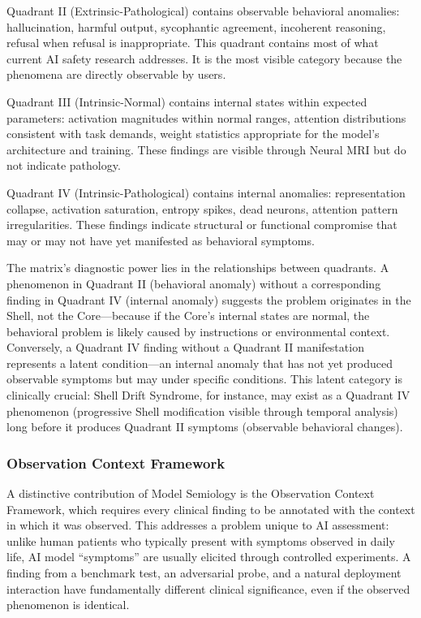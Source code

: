 \documentclass[11pt]{article}
\begin{document}
Quadrant II (Extrinsic-Pathological) contains observable behavioral anomalies: hallucination, harmful output, sycophantic agreement, incoherent reasoning, refusal when refusal is inappropriate. This quadrant contains most of what current AI safety research addresses. It is the most visible category because the phenomena are directly observable by users.

Quadrant III (Intrinsic-Normal) contains internal states within expected parameters: activation magnitudes within normal ranges, attention distributions consistent with task demands, weight statistics appropriate for the model's architecture and training. These findings are visible through Neural MRI but do not indicate pathology.

Quadrant IV (Intrinsic-Pathological) contains internal anomalies: representation collapse, activation saturation, entropy spikes, dead neurons, attention pattern irregularities. These findings indicate structural or functional compromise that may or may not have yet manifested as behavioral symptoms.

The matrix's diagnostic power lies in the relationships between quadrants. A phenomenon in Quadrant II (behavioral anomaly) without a corresponding finding in Quadrant IV (internal anomaly) suggests the problem originates in the Shell, not the Core---because if the Core's internal states are normal, the behavioral problem is likely caused by instructions or environmental context. Conversely, a Quadrant IV finding without a Quadrant II manifestation represents a latent condition---an internal anomaly that has not yet produced observable symptoms but may under specific conditions. This latent category is clinically crucial: Shell Drift Syndrome, for instance, may exist as a Quadrant IV phenomenon (progressive Shell modification visible through temporal analysis) long before it produces Quadrant II symptoms (observable behavioral changes).

\subsubsection{Observation Context Framework}

A distinctive contribution of Model Semiology is the Observation Context Framework, which requires every clinical finding to be annotated with the context in which it was observed. This addresses a problem unique to AI assessment: unlike human patients who typically present with symptoms observed in daily life, AI model ``symptoms'' are usually elicited through controlled experiments. A finding from a benchmark test, an adversarial probe, and a natural deployment interaction have fundamentally different clinical significance, even if the observed phenomenon is identical.
\end{document}
